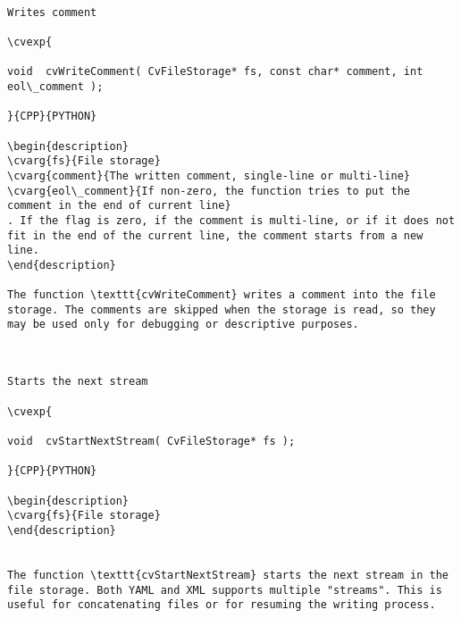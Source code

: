 \label{WriteComment}
\begin{verbatim}

Writes comment

\cvexp{

void  cvWriteComment( CvFileStorage* fs, const char* comment, int eol\_comment );

}{CPP}{PYTHON}

\begin{description}
\cvarg{fs}{File storage}
\cvarg{comment}{The written comment, single-line or multi-line}
\cvarg{eol\_comment}{If non-zero, the function tries to put the comment in the end of current line}
. If the flag is zero, if the comment is multi-line, or if it does not fit in the end of the current line, the comment starts from a new line.
\end{description}

The function \texttt{cvWriteComment} writes a comment into the file storage. The comments are skipped when the storage is read, so they may be used only for debugging or descriptive purposes.


\end{verbatim}
\label{StartNextStream}
\begin{verbatim}

Starts the next stream

\cvexp{

void  cvStartNextStream( CvFileStorage* fs );

}{CPP}{PYTHON}

\begin{description}
\cvarg{fs}{File storage}
\end{description}


The function \texttt{cvStartNextStream} starts the next stream in the file storage. Both YAML and XML supports multiple "streams". This is useful for concatenating files or for resuming the writing process.


\end{verbatim}
\label{Write}
